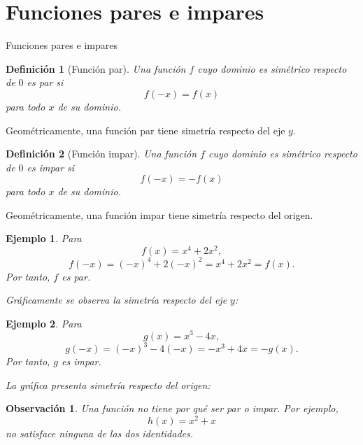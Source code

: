 \documentclass[aspectratio=169,10pt]{beamer}
\newtheorem{definicion}{Definición}
\newtheorem{observacion}{Observación}
\newtheorem{ejemplo}{Ejemplo}
\begin{document}
\section{Funciones pares e impares}
\begin{frame}{Funciones pares e impares}
\begin{definicion}[Función par]
Una función $f$ cuyo dominio es simétrico respecto de $0$ es \emph{par} si
\[
f(-x)=f(x)
\]
para todo $x$ de su dominio.
\end{definicion}

Geométricamente, una función par tiene simetría respecto del eje $y$.

\begin{definicion}[Función impar]
Una función $f$ cuyo dominio es simétrico respecto de $0$ es \emph{impar} si
\[
f(-x)=-f(x)
\]
para todo $x$ de su dominio.
\end{definicion}

Geométricamente, una función impar tiene simetría respecto del origen.

\begin{ejemplo}
Para
\[
f(x)=x^4+2x^2,
\]
\[
f(-x)=(-x)^4+2(-x)^2=x^4+2x^2=f(x).
\]
Por tanto, $f$ es par.

Gráficamente se observa la simetría respecto del eje $y$:
\begin{center}
\end{center}
\end{ejemplo}

\begin{ejemplo}
Para
\[
g(x)=x^3-4x,
\]
\[
g(-x)=(-x)^3-4(-x)=-x^3+4x=-g(x).
\]
Por tanto, $g$ es impar.

La gráfica presenta simetría respecto del origen:
\begin{center}
\end{center}
\end{ejemplo}

\begin{observacion}
Una función no tiene por qué ser par o impar. Por ejemplo,
\[
h(x)=x^2+x
\]
no satisface ninguna de las dos identidades.
\end{observacion}

\end{frame}
\end{document}
